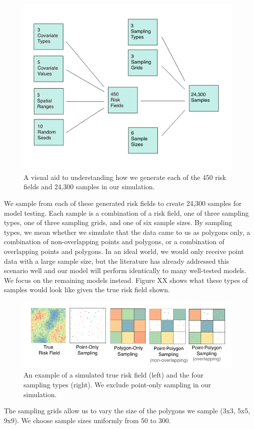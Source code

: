 \documentclass{article}
\begin{document}
 \begin{figure}[ht]
    \centering
    \includegraphics[width=.8\textwidth]{./figures/samplingexplained.png}
    \caption{A visual aid to understanding how we generate each of the 450 risk fields and 24,300 samples in our simulation.}
\end{figure}

We sample from each of these generated risk fields to create 24,300 samples for model testing. Each sample is a combination of a risk field, one of three sampling types, one of three sampling grids, and one of six sample sizes. By sampling types, we mean whether we simulate that the data came to us as polygons only, a combination of non-overlapping points and polygons, or a combination of overlapping points and polygons. In an ideal world, we would only receive point data with a large sample size, but the literature has already addressed this scenario well and our model will perform identically to many well-tested models. We focus on the remaining models instead. Figure XX shows what these types of samples would look like given the true risk field shown.
\begin{figure}[ht]
    \centering
    \includegraphics[width=.8\textwidth]{./figures/samplingtypes2.png}
    \caption{An example of a simulated true risk field (left) and the four sampling types (right). We exclude point-only sampling in our simulation.}
\end{figure} The sampling grids allow us to vary the size of the polygons we sample (3x3, 5x5, 9x9). We choose sample sizes uniformly from 50 to 300.
\end{document}

